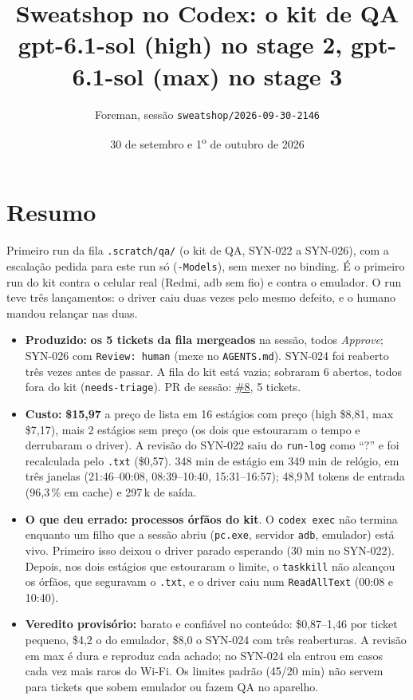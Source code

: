 \documentclass[11pt,a4paper]{article}
\title{Sweatshop no Codex: o kit de QA\\\large gpt-6.1-sol (high) no stage 2, gpt-6.1-sol (max) no stage 3}
\author{Foreman, sessão \texttt{sweatshop/2026-09-30-2146}}
\date{30 de setembro e 1\textsuperscript{o} de outubro de 2026}
\begin{document}
\maketitle

\section*{Resumo}

Primeiro run da fila \texttt{.scratch/qa/} (o kit de QA, SYN-022 a SYN-026),
com a escalação pedida para este run só (\texttt{-Models}), sem mexer no
binding. É o primeiro run do kit contra o celular real (Redmi, adb sem fio) e
contra o emulador. O run teve três lançamentos: o driver caiu duas vezes pelo
mesmo defeito, e o humano mandou relançar nas duas.

\begin{itemize}
  \item \textbf{Produzido:} \textbf{os 5 tickets da fila mergeados} na sessão,
        todos \emph{Approve}; SYN-026 com \texttt{Review: human} (mexe no
        \texttt{AGENTS.md}). SYN-024 foi reaberto três vezes antes de passar.
        A fila do kit está vazia; sobraram 6 abertos, todos fora do kit
        (\texttt{needs-triage}). PR de sessão:
        \href{https://github.com/Laginho/SynchroNice/pull/8}{\#8}, 5 tickets.
  \item \textbf{Custo:} \textbf{\$15,97} a preço de lista em 16 estágios com
        preço (high \$8,81, max \$7,17), mais 2 estágios sem preço (os dois que
        estouraram o tempo e derrubaram o driver). A revisão do SYN-022 saiu do
        \texttt{run-log} como ``?'' e foi recalculada pelo \texttt{.txt}
        (\$0,57). 348 min de estágio em 349 min de relógio, em três janelas
        (21:46--00:08, 08:39--10:40, 15:31--16:57); 48,9\,M tokens de entrada
        (96,3\,\% em cache) e 297\,k de saída.
  \item \textbf{O que deu errado:} \textbf{processos órfãos do kit}. O
        \texttt{codex exec} não termina enquanto um filho que a sessão abriu
        (\texttt{pc.exe}, servidor \texttt{adb}, emulador) está vivo. Primeiro
        isso deixou o driver parado esperando (30 min no SYN-022). Depois, nos
        dois estágios que estouraram o limite, o \texttt{taskkill} não alcançou
        os órfãos, que seguravam o \texttt{.txt}, e o driver caiu num
        \texttt{ReadAllText} (00:08 e 10:40).
  \item \textbf{Veredito provisório:} barato e confiável no conteúdo:
        \$0,87--1,46 por ticket pequeno, \$4,2 o do emulador, \$8,0 o
        SYN-024 com três reaberturas. A revisão em max é dura e reproduz cada
        achado; no SYN-024 ela entrou em casos cada vez mais raros do Wi-Fi. Os
        limites padrão (45/20 min) não servem para tickets que sobem emulador
        ou fazem QA no aparelho.
\end{itemize}
\end{document}
